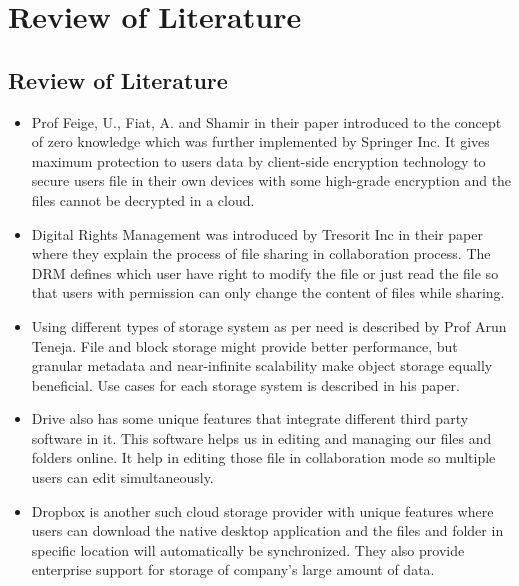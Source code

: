 \chapter{Review of Literature}
\newpage
\section{Review of Literature}


\begin{itemize}
\item Prof Feige, U., Fiat, A. and Shamir in their paper introduced to the concept of zero knowledge which was further implemented by Springer Inc. It gives maximum protection to users data by client-side encryption technology to secure users file in their own devices with some high-grade encryption  and the files cannot be decrypted in a cloud.

\item Digital Rights Management was introduced by Tresorit Inc in their paper where they explain the process of file sharing in collaboration process. The DRM defines which user have right to modify the file or just read the file so that users with permission can only change the content of files while sharing.

\item Using different types of storage system as per need is described by Prof Arun Teneja. File and block storage might provide better performance, but granular metadata and near-infinite scalability make object storage equally beneficial. Use cases for each storage system is described in his paper.

\item Drive also has some unique features that integrate different third party software in it. This software helps us in editing and managing our files and folders online. It help in editing those file in collaboration mode so multiple users can edit simultaneously.

\item Dropbox is another such cloud storage provider with unique features where users can download the native desktop application and the files and folder in specific location will automatically be synchronized. They also provide enterprise support for storage of company’s large amount of data.




\end{itemize}
